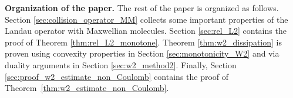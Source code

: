 \documentclass[11pt]{amsart}
\numberwithin{equation}{section}
\newtheorem{theorem}{Theorem}
\begin{document}



\noindent \textbf{Organization of the paper.}  The rest of the paper is organized as follows.  Section \ref{sec:collision_operator_MM} collects some important properties  of the Landau operator with Maxwellian molecules. Section \ref{sec:rel_L2} contains the proof of Theorem \ref{thm:rel_L2_monotone}.  Theorem \ref{thm:w2_dissipation} is proven using convexity properties in Section \ref{sec:monotonicity_W2}   and via duality arguments in  Section \ref{sec:w2_method2}.  Finally, Section \ref{sec:proof_w2_estimate_non_Coulomb} contains the proof of Theorem~\ref{thm:w2_estimate_non_Coulomb}.
\end{document}
